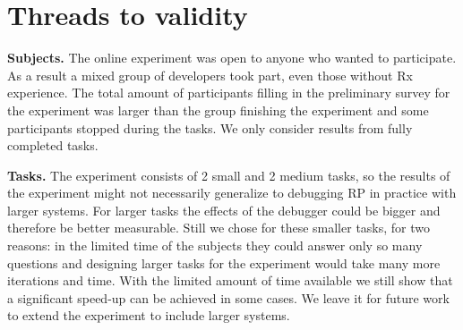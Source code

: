 \section{Threads to validity}


\textbf{Subjects.} The online experiment was open to anyone who wanted to participate. As a result a mixed group of developers took part, even those without Rx experience. The total amount of participants filling in the preliminary survey for the experiment was larger than the group finishing the experiment and some participants stopped during the tasks. We only consider results from fully completed tasks.

\textbf{Tasks.} The experiment consists of 2 small and 2 medium tasks, so the results of the experiment might not necessarily generalize to debugging RP in practice with larger systems. For larger tasks the effects of the debugger could be bigger and therefore be better measurable. Still we chose for these smaller tasks, for two reasons: in the limited time of the subjects they could answer only so many questions and designing larger tasks for the experiment would take many more iterations and time. With the limited amount of time available we still show that a significant speed-up can be achieved in some cases. We leave it for future work to extend the experiment to include larger systems.
